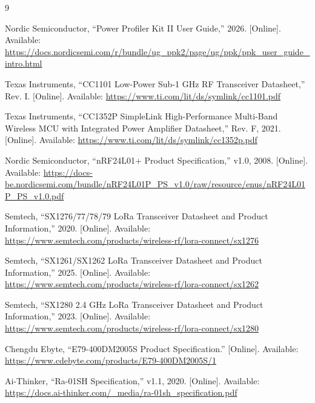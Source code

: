 \documentclass[10pt,a4paper]{article}
\begin{document}
\begin{thebibliography}{9}

Nordic Semiconductor, ``Power Profiler Kit II User Guide,'' 2026. [Online]. Available: \url{https://docs.nordicsemi.com/r/bundle/ug_ppk2/page/ug/ppk/ppk_user_guide_intro.html}

Texas Instruments, ``CC1101 Low-Power Sub-1 GHz RF Transceiver Datasheet,'' Rev. I. [Online]. Available: \url{https://www.ti.com/lit/ds/symlink/cc1101.pdf}

Texas Instruments, ``CC1352P SimpleLink High-Performance Multi-Band Wireless MCU with Integrated Power Amplifier Datasheet,'' Rev. F, 2021. [Online]. Available: \url{https://www.ti.com/lit/ds/symlink/cc1352p.pdf}

Nordic Semiconductor, ``nRF24L01+ Product Specification,'' v1.0, 2008. [Online]. Available: \url{https://docs-be.nordicsemi.com/bundle/nRF24L01P_PS_v1.0/raw/resource/enus/nRF24L01P_PS_v1.0.pdf}

Semtech, ``SX1276/77/78/79 LoRa Transceiver Datasheet and Product Information,'' 2020. [Online]. Available: \url{https://www.semtech.com/products/wireless-rf/lora-connect/sx1276}

Semtech, ``SX1261/SX1262 LoRa Transceiver Datasheet and Product Information,'' 2025. [Online]. Available: \url{https://www.semtech.com/products/wireless-rf/lora-connect/sx1262}

Semtech, ``SX1280 2.4 GHz LoRa Transceiver Datasheet and Product Information,'' 2023. [Online]. Available: \url{https://www.semtech.com/products/wireless-rf/lora-connect/sx1280}

Chengdu Ebyte, ``E79-400DM2005S Product Specification.'' [Online]. Available: \url{https://www.cdebyte.com/products/E79-400DM2005S/1}

Ai-Thinker, ``Ra-01SH Specification,'' v1.1, 2020. [Online]. Available: \url{https://docs.ai-thinker.com/_media/ra-01sh_specification.pdf}

\end{thebibliography}
\end{document}
